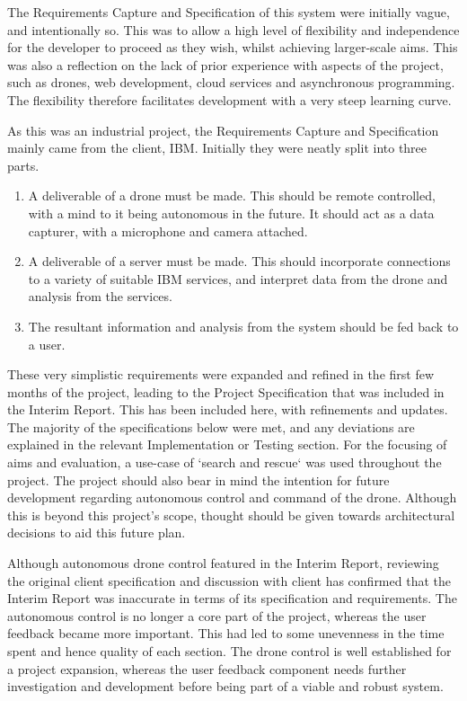 \documentclass{article}
\begin{document}
The Requirements Capture and Specification of this system were initially vague, and intentionally so. This was to allow a high level of flexibility and independence for the developer to proceed as they wish, whilst achieving larger-scale aims. This was also a reflection on the lack of prior experience with aspects of the project, such as drones, web development, cloud services and asynchronous programming. The flexibility therefore facilitates development with a very steep learning curve.

As this was an industrial project, the Requirements Capture and Specification mainly came from the client, IBM. Initially they were neatly split into three parts.

\begin{enumerate}
\item A deliverable of a drone must be made. This should be remote controlled, with a mind to it being autonomous in the future. It should act as a data capturer, with a microphone and camera attached.
\item A deliverable of a server must be made. This should incorporate connections to a variety of suitable IBM services, and interpret data from the drone and analysis from the services.
\item The resultant information and analysis from the system should be fed back to a user. 
\end{enumerate}

These very simplistic requirements were expanded and refined in the first few months of the project, leading to the Project Specification that was included in the Interim Report. This has been included here, with refinements and updates. The majority of the specifications below were met, and any deviations are explained in the relevant Implementation or Testing section. For the focusing of aims and evaluation, a use-case of `search and rescue` was used throughout the project. The project should also bear in mind the intention for future development regarding autonomous control and command of the drone. Although this is beyond this project's scope, thought should be given towards architectural decisions to aid this future plan. 

Although autonomous drone control featured in the Interim Report, reviewing the original client specification and discussion with client has confirmed that the Interim Report was inaccurate in terms of its specification and requirements. The autonomous control is no longer a core part of the project, whereas the user feedback became more important. This had led to some unevenness in the time spent and hence quality of each section. The drone control is well established for a project expansion, whereas the user feedback component needs further investigation and development before being part of a viable and robust system. 
\end{document}
